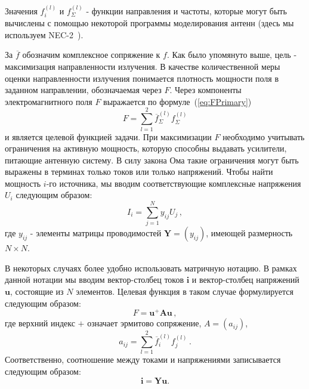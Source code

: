 Значения $f_i^{(l)}$ и $f^{(l)}_{\Sigma}$ - функции направления и частоты, которые могут быть вычислены с помощью некоторой программы моделирования антенн (здесь мы используем NEC-2~\cite{bruke:nec2}).

За $\overline{f}$ обозначим комплексное сопряжение к $f$. Как было упомянуто выше, цель - максимизация направленности излучения. В качестве количественной меры оценки направленности излучения понимается плотность мощности поля в заданном направлении, обозначаемая через $F$. Через компоненты электромагнитного поля $F$ выражается по формуле~(\ref{eq:FPrimary})
%
    \begin{equation}
        F = \sum_{l=1}^{2}\overline{f}_{\Sigma}^{(l)}f_{\Sigma}^{(l)}
        \label{eq:FPrimary}
    \end{equation}
%
и является целевой функцией задачи. При максимизации $F$ необходимо учитывать ограничения на активную мощность, которую способны выдавать усилители, питающие антенную систему. В силу закона Ома такие ограничения могут быть выражены в терминах только токов или только напряжений. Чтобы найти мощность $i$-го источника, мы вводим соответствующие комплексные напряжения~$U_i$ следующим образом:
%
    \begin{equation}
        I_i = \sum_{j=1}^{N}y_{ij}U_j \, ,
        \label{eq:om}
    \end{equation}
%
где $y_{ij}$ - элементы матрицы проводимостей $\textbf{Y} = (y_{ij})$, имеющей размерность $N \times N$.

В некоторых случаях более удобно использовать матричную нотацию. В рамках данной нотации мы вводим вектор-столбец токов $\textbf{i}$ и вектор-столбец напряжений $\textbf{u}$, состоящие из $N$ элементов. Целевая функция в таком случае формулируется следующим образом:
%
    \begin{equation}
        F = \textbf{u}^{+}\textbf{Au} \, ,
        \label{eq:F}
    \end{equation}
%
где верхний индекс $+$ означает эрмитово сопряжение, $A = (a_{ij})$,
%
     \begin{equation}
        a_{ij} = \sum_{l=1}^2\overline{f}_{i}^{(l)}f_{j}^{(l)}
        \label{eq:A} \, .
    \end{equation}
%
Соответственно, соотношение между токами и напряжениями записывается следующим образом:
%
    \begin{equation}
    \textbf{i}=\textbf{Y}\textbf{u} .
    \end{equation}
%

